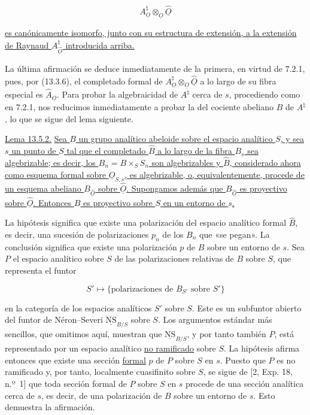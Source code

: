 \begin{equation*}
 A^{\natural}_{\underline O}\otimes_{\underline O}
 \hat{\underline O}
\end{equation*}

\noindent
\underline{es canónicamente isomorfo, junto con su estructura de
extensión, a la extensión de Raynaud
$A^{\natural}_{\hat{\underline O}}$ introducida arriba.}

La última afirmación se deduce inmediatamente de la primera, en virtud
de 7.2.1, pues, por (13.3.6), el completado formal de
$A^{\natural}_{\underline O}\otimes_{\underline O}\hat{\underline O}$
a lo largo de su fibra especial es $\hat A_{\underline O}$. Para probar
la algebraicidad de $A^{\natural}$ cerca de $s$, procediendo como en
7.2.1, nos reducimos inmediatamente a probar la del cociente abeliano
$B$ de $A^{\natural}$, lo que se sigue del lema siguiente.

\medskip
\noindent
\underline{Lema 13.5.2.} \underline{Sea $B$ un grupo analítico abeloide
sobre el espacio analítico $S$, y sea $s$ un punto de $S$ tal que el
completado $\hat B$ a lo largo de la fibra $B_s$ sea algebrizable; es
decir, los $B_n=B\times_S S_n$ son algebrizables y $\hat B$,
considerado ahora como esquema formal sobre
$\hat{\underline O}_{S,s}$, es algebrizable, o, equivalentemente,
procede de un esquema abeliano $B_{\hat{\underline O}}$ sobre
$\hat{\underline O}$. Supongamos además que
$B_{\hat{\underline O}}$ es proyectivo sobre $\hat{\underline O}$.
Entonces $B$ es proyectivo sobre $S$ en un entorno de $s$.}

La hipótesis significa que existe una polarización del espacio
analítico formal $\hat B$, es decir, una sucesión de polarizaciones
$p_n$ de los $B_n$ que «se pegan». La conclusión significa que existe
una polarización $p$ de $B$ sobre un entorno de $s$. Sea $P$ el espacio
analítico sobre $S$ de las polarizaciones relativas de $B$ sobre $S$,
que representa el funtor

\begin{equation*}
 S'\longmapsto
 \{\text{polarizaciones de $B_{S'}$ sobre $S'$}\}
\end{equation*}

\noindent
en la categoría de los espacios analíticos $S'$ sobre $S$. Este es un
subfuntor abierto del funtor de Néron--Severi
$\underline{\mathrm{NS}}_{B/S}$ sobre $S$. Los argumentos estándar más
sencillos, que omitimos aquí, muestran que
$\underline{\mathrm{NS}}_{B/S}$, y por tanto también $P$, está
representado por un espacio analítico \underline{no ramificado} sobre
$S$. La hipótesis afirma entonces que existe una sección
\underline{formal} $p$ de $P$ sobre $S$ en $s$. Puesto que $P$ es no
ramificado y, por tanto, localmente cuasifinito sobre $S$, se sigue de
[2, Exp. 18, n.º~1] que toda sección formal de $P$ sobre $S$ en $s$
procede de una sección analítica cerca de $s$, es decir, de una
polarización de $B$ sobre un entorno de $s$. Esto demuestra la
afirmación.

